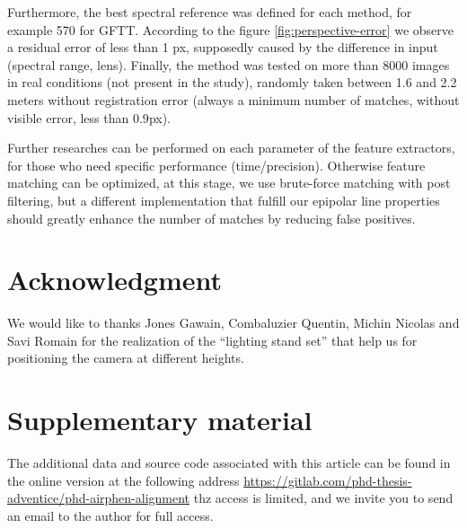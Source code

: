 \documentclass[]{elsarticle}
\begin{document}
	Furthermore, the best spectral reference was defined for each method, for example 570 for GFTT.
	According to the figure \ref{fig:perspective-error} we observe a residual error of less than 1 px,
	supposedly caused by the difference in input (spectral range, lens).
	Finally, the method was tested on more than 8000 images in real conditions (not present in the study),
	randomly taken between 1.6 and 2.2 meters without registration error (always a minimum number of matches, without visible error, less than $0.9$px).
	\\
	\par Further researches can be performed on each parameter of the feature extractors, for those who need specific performance (time/precision).
	Otherwise feature matching can be optimized, at this stage, we use brute-force matching with post filtering,
	but a different implementation that fulfill our epipolar line properties should greatly enhance the number of matches by reducing false positives.
	
	\section{Acknowledgment}
	
	We would like to thanks Jones Gawain, Combaluzier Quentin, Michin Nicolas and Savi Romain
	for the realization of the ``lighting stand set'' that help us for positioning the camera at different heights.
	
	\section{Supplementary material}
	
	The additional data and source code associated with this article can be found in the online version at the following address
	\url{https://gitlab.com/phd-thesis-adventice/phd-airphen-alignment} thz access is limited,
	and we invite you to send an email to the author for full access.
	
	
	
	
\end{document}
